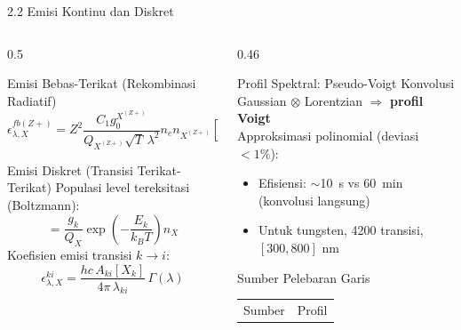 \documentclass[aspectratio=169, 10pt]{beamer}
\begin{document}
\begin{frame}{2.2 Emisi Kontinu dan Diskret}
  \begin{columns}[T]
    \begin{column}{0.5\textwidth}
      \begin{block}{Emisi Bebas-Terikat (Rekombinasi Radiatif)}
        \footnotesize
        \begin{equation}
          \epsilon_{\lambda,X}^{fb(Z+)} = Z^2\frac{C_1 g_0^{X^{(Z+)}}}{Q_{X^{(Z+)}}\sqrt{T}\,\lambda^2}
          n_e n_{X^{(Z+)}}\!\left[1-e^{-\frac{hc}{\lambda k_BT}}\right]\xi^{fb}
        \end{equation}
      \end{block}
      \vspace{4pt}
      \begin{block}{Emisi Diskret (Transisi Terikat-Terikat)}
        \footnotesize
        Populasi level tereksitasi (Boltzmann):
        \begin{equation}
          [X_k] = \frac{g_k}{Q_X}\exp\!\left(-\frac{E_k}{k_BT}\right) n_X
        \end{equation}
        Koefisien emisi transisi $k\to i$:
        \begin{equation}
          \epsilon_{\lambda,X}^{ki} = \frac{hc\,A_{ki}[X_k]}{4\pi\,\lambda_{ki}}\,\Gamma(\lambda)
        \end{equation}
      \end{block}
    \end{column}
    \begin{column}{0.46\textwidth}
      \begin{exampleblock}{Profil Spektral: Pseudo-Voigt}
        \small
        Konvolusi Gaussian $\otimes$ Lorentzian $\Rightarrow$ \textbf{profil Voigt}\\
        Approksimasi polinomial (deviasi $<1\%$):
        \begin{itemize}\scriptsize
          \item Efisiensi: $\sim$\SI{10}{s} vs \SI{60}{min} (konvolusi langsung)
          \item Untuk tungsten, 4200 transisi, $[300, 800]$ nm
        \end{itemize}
      \end{exampleblock}
      \vspace{4pt}
      \begin{alertblock}{Sumber Pelebaran Garis}
        \scriptsize
        \begin{tabular}{ll}
          \toprule
          Sumber & Profil \\

\end{tabular}
\end{alertblock}
\end{column}
\end{columns}
\end{frame}
\end{document}
